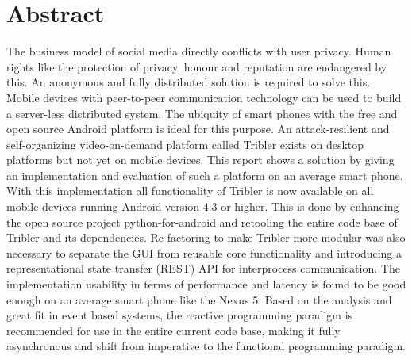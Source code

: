 \chapter*{Abstract}

The business model of social media directly conflicts with user privacy.
Human rights like the protection of privacy, honour and reputation are endangered by this.
An anonymous and fully distributed solution is required to solve this.
Mobile devices with peer-to-peer communication technology can be used to build a server-less distributed system.
The ubiquity of smart phones with the free and open source Android platform is ideal for this purpose.
An attack-resilient and self-organizing video-on-demand platform called Tribler exists on desktop platforms but not yet on mobile devices.
This report shows a solution by giving an implementation and evaluation of such a platform on an average smart phone.
With this implementation all functionality of Tribler is now available on all mobile devices running Android version 4.3 or higher.
This is done by enhancing the open source project python-for-android and retooling the entire code base of Tribler and its dependencies.
Re-factoring to make Tribler more modular was also necessary to separate the GUI from reusable core functionality and introducing a representational state transfer (REST) API for interprocess communication.
The implementation usability in terms of performance and latency is found to be good enough on an average smart phone like the Nexus 5.
Based on the analysis and great fit in event based systems, the reactive programming paradigm is recommended for use in the entire current code base, making it fully asynchronous and shift from imperative to the functional programming paradigm.
